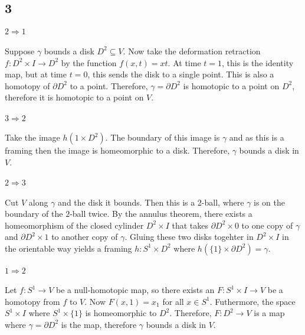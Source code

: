 \documentclass{article}
\theoremstyle{definition}
\numberwithin{theorem}{section}
\numberwithin{equation}{section}
\begin{document}
\subsection{3}

\paragraph*{$2 \Rightarrow 1$} Suppose $\gamma$ bounds a disk $D^2 \subseteq V$. Now take the deformation retraction $f : D^2 \times I \rightarrow D^2$ by the function $f(x, t) = xt$. At time $t = 1$, this is the identity map, but at time $t = 0$, this sends the disk to a single point. This is also a homotopy of $\partial D^2$ to a point. Therefore, $\gamma = \partial D^2$ is homotopic to a point on $D^2$, therefore it is homotopic to a point on $V$.

\paragraph*{$3 \Rightarrow 2$} Take the image $h({1} \times D^2)$. The boundary of this image is $\gamma$ and as this is a framing then the image is homeomorphic to a disk. Therefore, $\gamma$ bounds a disk in $V$.

\paragraph{$2 \Rightarrow 3$} Cut $V$ along $\gamma$ and the disk it bounds. Then this is a 2-ball, where $\gamma$ is on the boundary of the $2$-ball twice. By the annulus theorem, there exists a homeomorphism of the closed cylinder $D^2 \times I$ that takes $\partial D^2 \times {0}$ to one copy of $\gamma$ and $\partial D^2 \times {1}$ to another copy of $\gamma$. Gluing these two disks togehter in $D^2 \times I$ in the orientable way yields a framing $h : S^1 \times D^2$ where $h(\{1\} \times \partial D^2) = \gamma$. 

\paragraph{$1 \Rightarrow 2$} Let $f : S^1 \rightarrow V$ be a null-homotopic map, so there exists an $F: S^1 \times I \rightarrow V$ be a homotopy from $f$ to $V$. Now $F(x, 1) = x_1$ for all $x \in S^1$. Futhermore, the space $S^1 \times I$ where $S^1 \times \{1\}$ is homeomorphic to $D^2$. Therefore, $F : D^2 \rightarrow V$ is a map where $\gamma = \partial D^2$ is the map, therefore $\gamma$ bounds a disk in $V$.
\end{document}
